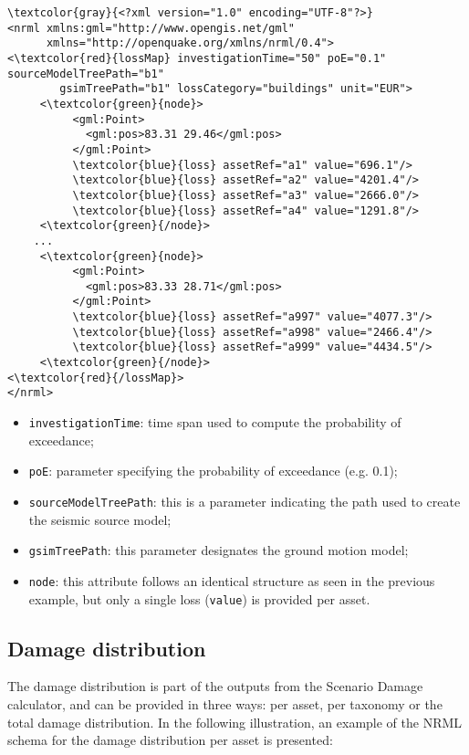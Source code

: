 \begin{Verbatim}[frame=single, commandchars=\\\{\}, samepage=false]
\textcolor{gray}{<?xml version="1.0" encoding="UTF-8"?>}
<nrml xmlns:gml="http://www.opengis.net/gml"
      xmlns="http://openquake.org/xmlns/nrml/0.4">
<\textcolor{red}{lossMap} investigationTime="50" poE="0.1" sourceModelTreePath="b1" 
        gsimTreePath="b1" lossCategory="buildings" unit="EUR">
     <\textcolor{green}{node}>
          <gml:Point>
            <gml:pos>83.31 29.46</gml:pos>
          </gml:Point>
          \textcolor{blue}{loss} assetRef="a1" value="696.1"/>
          \textcolor{blue}{loss} assetRef="a2" value="4201.4"/>
          \textcolor{blue}{loss} assetRef="a3" value="2666.0"/>
          \textcolor{blue}{loss} assetRef="a4" value="1291.8"/>
     <\textcolor{green}{/node}>
    ...
     <\textcolor{green}{node}>
          <gml:Point>
            <gml:pos>83.33 28.71</gml:pos>
          </gml:Point>
          \textcolor{blue}{loss} assetRef="a997" value="4077.3"/>
          \textcolor{blue}{loss} assetRef="a998" value="2466.4"/>
          \textcolor{blue}{loss} assetRef="a999" value="4434.5"/>
     <\textcolor{green}{/node}>
<\textcolor{red}{/lossMap}>
</nrml>
\end{Verbatim}

\begin{itemize}
\item  \Verb+investigationTime+: time span used to compute the probability of exceedance;
\item  \Verb+poE+: parameter specifying the probability of exceedance (e.g. 0.1);
\item  \Verb+sourceModelTreePath+: this is a parameter indicating the path used to create the seismic source model;
\item  \Verb+gsimTreePath+: this parameter designates the ground motion model;
\item  \Verb+node+: this attribute follows an identical structure as seen in the previous example, but only a single loss (\Verb+value+) is provided per asset.
\end{itemize}

\subsection{Damage distribution}
The damage distribution is part of the outputs from the Scenario Damage calculator, and can be provided in three ways: per asset, per taxonomy or the total damage distribution. In the following illustration, an example of the NRML schema for the damage distribution per asset is presented: 

